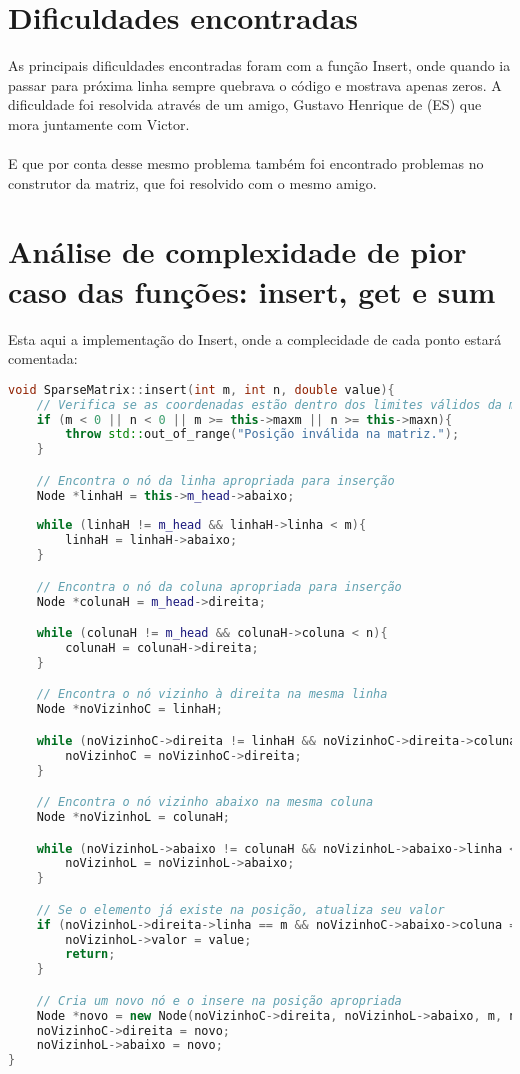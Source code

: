 \documentclass[a4paper,12pt]{article}
\begin{document}
\section{Dificuldades encontradas}
As principais dificuldades encontradas foram com a função Insert, onde quando ia passar para próxima linha sempre quebrava o código e mostrava apenas zeros. A dificuldade foi resolvida através de um amigo, Gustavo Henrique de (ES) que mora juntamente com Victor.
\\\\
E que por conta desse mesmo problema também foi encontrado problemas no construtor da matriz, que foi resolvido com o mesmo amigo.
\section{Análise de complexidade de pior caso das funções: insert, get e sum}
Esta aqui a implementação do Insert, onde a complecidade de cada ponto estará comentada:
\begin{lstlisting}[language=C++]
void SparseMatrix::insert(int m, int n, double value){
    // Verifica se as coordenadas estão dentro dos limites válidos da matriz
    if (m < 0 || n < 0 || m >= this->maxm || n >= this->maxn){
        throw std::out_of_range("Posição inválida na matriz.");
    }

    // Encontra o nó da linha apropriada para inserção
    Node *linhaH = this->m_head->abaixo;
    
    while (linhaH != m_head && linhaH->linha < m){
        linhaH = linhaH->abaixo;
    }

    // Encontra o nó da coluna apropriada para inserção
    Node *colunaH = m_head->direita;

    while (colunaH != m_head && colunaH->coluna < n){
        colunaH = colunaH->direita;
    }

    // Encontra o nó vizinho à direita na mesma linha
    Node *noVizinhoC = linhaH;

    while (noVizinhoC->direita != linhaH && noVizinhoC->direita->coluna < n){
        noVizinhoC = noVizinhoC->direita;
    }

    // Encontra o nó vizinho abaixo na mesma coluna
    Node *noVizinhoL = colunaH;

    while (noVizinhoL->abaixo != colunaH && noVizinhoL->abaixo->linha < m){
        noVizinhoL = noVizinhoL->abaixo;
    }

    // Se o elemento já existe na posição, atualiza seu valor
    if (noVizinhoL->direita->linha == m && noVizinhoC->abaixo->coluna == n){
        noVizinhoL->valor = value;
        return;
    }

    // Cria um novo nó e o insere na posição apropriada
    Node *novo = new Node(noVizinhoC->direita, noVizinhoL->abaixo, m, n, value);
    noVizinhoC->direita = novo; 
    noVizinhoL->abaixo = novo;
}
\end{lstlisting}
\end{document}
